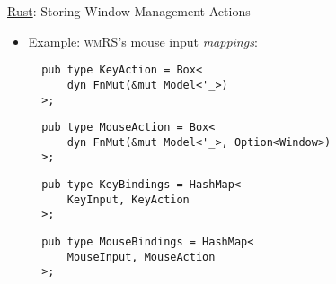 \begin{frame}[fragile]{\underline{Rust}: Storing Window Management Actions \hfill {\footnotesize \currentname}}


    \begin{itemize}

        \item Example: \textsc{wmRS}'s mouse input \textit{mappings}:\\[3pt]
\begin{verbatim}
  pub type KeyAction = Box<
      dyn FnMut(&mut Model<'_>)
  >;
\end{verbatim}
\begin{verbatim}
  pub type MouseAction = Box<
      dyn FnMut(&mut Model<'_>, Option<Window>)
  >;
\end{verbatim}
\begin{verbatim}
  pub type KeyBindings = HashMap<
      KeyInput, KeyAction
  >;
\end{verbatim}
\begin{verbatim}
  pub type MouseBindings = HashMap<
      MouseInput, MouseAction
  >;
\end{verbatim}

    \end{itemize}

    \vfill

\end{frame}

